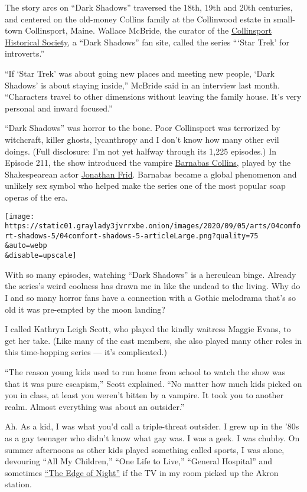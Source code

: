 The story arcs on ``Dark Shadows'' traversed the 18th, 19th and 20th
centuries, and centered on the old-money Collins family at the
Collinwood estate in small-town Collinsport, Maine. Wallace McBride, the
curator of the
\href{http://www.collinsporthistoricalsociety.com/}{Collinsport
Historical Society}, a ``Dark Shadows'' fan site, called the series
```Star Trek' for introverts.''

``If `Star Trek' was about going new places and meeting new people,
`Dark Shadows' is about staying inside,'' McBride said in an interview
last month. ``Characters travel to other dimensions without leaving the
family house. It's very personal and inward focused.''

``Dark Shadows'' was horror to the bone. Poor Collinsport was terrorized
by witchcraft, killer ghosts, lycanthropy and I don't know how many
other evil doings. (Full disclosure: I'm not yet halfway through its
1,225 episodes.) In Episode 211, the show introduced the vampire
\href{https://www.youtube.com/watch?v=WyYg2bD-U94}{Barnabas Collins},
played by the Shakespearean actor
\href{https://www.nytimes3xbfgragh.onion/2012/04/20/arts/television/jonathan-frid-ghoulish-dark-shadows-star-dies-at-87.html}{Jonathan
Frid}. Barnabas became a global phenomenon and unlikely sex symbol who
helped make the series one of the most popular soap operas of the era.

\texttt{[image: https://static01.graylady3jvrrxbe.onion/images/2020/09/05/arts/04comfort-shadows-5/04comfort-shadows-5-articleLarge.png?quality=75\\\&auto=webp\\\&disable=upscale]}

With so many episodes, watching ``Dark Shadows'' is a herculean binge.
Already the series's weird coolness has drawn me in like the undead to
the living. Why do I and so many horror fans have a connection with a
Gothic melodrama that's so old it was pre-empted by the moon landing?

I called Kathryn Leigh Scott, who played the kindly waitress Maggie
Evans, to get her take. (Like many of the cast members, she also played
many other roles in this time-hopping series --- it's complicated.)

``The reason young kids used to run home from school to watch the show
was that it was pure escapism,'' Scott explained. ``No matter how much
kids picked on you in class, at least you weren't bitten by a vampire.
It took you to another realm. Almost everything was about an outsider.''

Ah. As a kid, I was what you'd call a triple-threat outsider. I grew up
in the '80s as a gay teenager who didn't know what gay was. I was a
geek. I was chubby. On summer afternoons as other kids played something
called sports, I was alone, devouring ``All My Children,'' ``One Life to
Live,'' ``General Hospital'' and sometimes
\href{https://www.youtube.com/watch?v=aZwTIaYAEOU}{``The Edge of
Night''} if the TV in my room picked up the Akron station.

